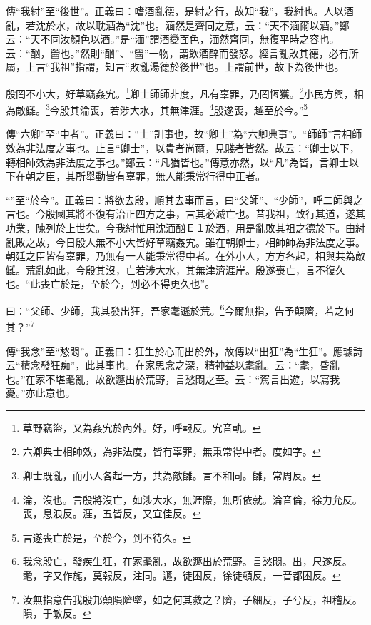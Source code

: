 {\noindent\zhuan{}\fzbyks 傳“我紂”至“後世”。正義曰：嗜酒亂德，是紂之行，故知“我”，我紂也。人以酒亂，若沈於水，故以耽酒為“沈”也。湎然是齊同之意，云：“天不湎爾以酒。”鄭云：“天不同汝顏色以酒。”是“湎”謂酒變面色，湎然齊同，無復平時之容也。云：“酗，醟也。”然則“酗”、“醟”一物，謂飲酒醉而發怒。經言亂敗其德，必有所屬，上言“我祖”指謂，知言“敗亂湯德於後世”也。上謂前世，故下為後世也。 \par}

殷罔不小大，好草竊姦宄。\footnote{草野竊盜，又為姦宄於內外。好，呼報反。宄音軌。}卿士師師非度，凡有辜罪，乃罔恆獲。\footnote{六卿典士相師效，為非法度，皆有辜罪，無秉常得中者。度如字。}小民方興，相為敵讎。\footnote{卿士既亂，而小人各起一方，共為敵讎。言不和同。讎，常周反。}今殷其淪喪，若涉大水，其無津涯。\footnote{淪，沒也。言殷將沒亡，如涉大水，無涯際，無所依就。淪音倫，徐力允反。喪，息浪反。涯，五皆反，又宜佳反。}殷遂喪，越至於今。”\footnote{言遂喪亡於是，至於今，到不待久。}

{\noindent\zhuan{}\fzbyks 傳“六卿”至“中者”。正義曰：“士”訓事也，故“卿士”為“六卿典事”。“師師”言相師效為非法度之事也。止言“卿士”，以貴者尚爾，見賤者皆然。故云：“卿士以下，轉相師效為非法度之事也。”鄭云：“凡猶皆也。”傳意亦然，以“凡”為皆，言卿士以下在朝之臣，其所舉動皆有辜罪，無人能秉常行得中正者。 \par}

{\noindent\shu{}\fzkt “”至“於今”。正義曰：將欲去殷，順其去事而言，曰“父師”、“少師”，呼二師與之言也。今殷國其將不復有治正四方之事，言其必滅亡也。昔我祖，致行其道，遂其功業，陳列於上世矣。今我紂惟用沈湎酗Ｅ１於酒，用是亂敗其祖之德於下。由紂亂敗之故，今日殷人無不小大皆好草竊姦宄。雖在朝卿士，相師師為非法度之事。朝廷之臣皆有辜罪，乃無有一人能秉常得中者。在外小人，方方各起，相與共為敵讎。荒亂如此，今殷其沒，亡若涉大水，其無津濟涯岸。殷遂喪亡，言不復久也。“此喪亡於是，至於今，到必不得更久也”。 \par}

曰：“父師、少師，我其發出狂，吾家耄遜於荒。\footnote{我念殷亡，發疾生狂，在家耄亂，故欲遯出於荒野。言愁悶。出，尺遂反。耄，字又作旄，莫報反，注同。遯，徒困反，徐徒頓反，一音都困反。}今爾無指，告予顛隮，若之何其？”\footnote{汝無指意告我殷邦顛隕隮墜，如之何其救之？隮，子細反，子兮反，祖稽反。隕，于敏反。}


{\noindent\zhuan{}\fzbyks 傳“我念”至“愁悶”。正義曰：狂生於心而出於外，故傳以“出狂”為“生狂”。應璩詩云“積念發狂痴”，此其事也。在家思念之深，精神益以耄亂。云：“耄，昏亂也。”在家不堪耄亂，故欲遯出於荒野，言愁悶之至。云：“駕言出遊，以寫我憂。”亦此意也。 \par}

